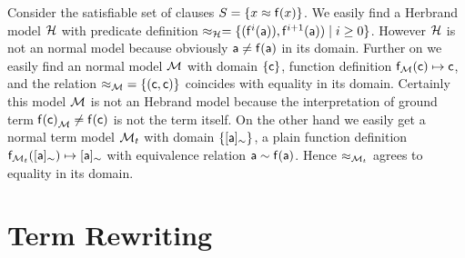 \begin{example}
	Consider the satisfiable set of clauses $S = \{ x \approx {\mathsf f}(x) \}$. 
	We easily find a Herbrand model ${\mathcal H}$ with
	predicate definition $\approx_{\mathcal H} = \{ ({\mathsf f}^{i}({\mathsf a})), {\mathsf f}^{i+1}({\mathsf a})) \mid i\geq 0  \} $. 
	However ${\mathcal H}$ is not an normal model because obviously ${\mathsf a}\neq{\mathsf f}({\mathsf a})$ in its domain.
	Further on we easily find an normal model ${\mathcal M}$ 
	with domain $\{ {\mathsf c} \}$, function definition ${\mathsf f}_{\mathcal M}({\mathsf c}) \mapsto {\mathsf c}$, 
	and the relation ${\approx_{\mathcal M}} = \{ ({\mathsf c},{\mathsf c})\}$ coincides with equality in its domain.
	Certainly this model ${\mathcal M}$ is not an Hebrand model 
	because the interpretation of ground term ${{\mathsf f}({\mathsf c})}_{\mathcal M} \neq {\mathsf f}({\mathsf c})$ is not the term itself.
	On the other hand we easily get a normal term model ${\mathcal M}_t$ with domain $\{ [{\mathsf a}]_\sim\}$, 
	a plain function definition
	${\mathsf f}_{{\mathcal M}_t}([{\mathsf a}]_\sim) \mapsto [{\mathsf a}]_\sim$ 
	with equivalence relation
	${\mathsf a} \sim {\mathsf f}({\mathsf a})$.
	Hence $\approx_{{\mathcal M}_t}$ agrees to equality in its domain.	
\end{example}





\section{Term Rewriting}\label{sec:termrewriting}


